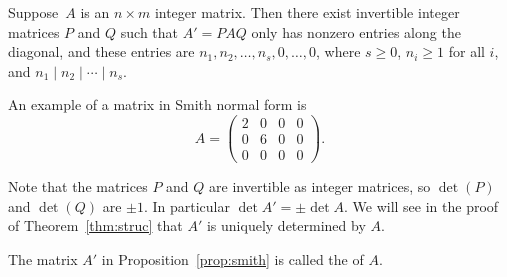 \begin{proposition}
  \label{prop:smith}
  Suppose~$A$ is an $n\times m$ integer matrix.  Then there exist
  invertible integer matrices $P$ and $Q$ such that $A'=PAQ$ only
  has nonzero entries along the diagonal, and these entries are
  $n_1, n_2,\dots, n_s,0,\dots,0$, where
  $s\geq 0$, $n_i\geq 1$ for all $i$, and $n_1\mid n_2 \mid \cdots \mid n_s$.
\end{proposition}

\begin{example}
	An example of a matrix in Smith normal form is
	\[
		A = \begin{pmatrix}
		2 & 0 & 0 & 0 \\
		0 & 6 & 0 & 0 \\
		0 & 0 & 0 & 0
		\end{pmatrix}.
	\]
\end{example}

\begin{remark}
  Note that the matrices $P$ and $Q$ are invertible as integer
  matrices, so $\det(P)$ and $\det(Q)$ are $\pm 1$. In particular
  $\det A' = \pm\det A$. We will see in the proof of Theorem~\ref{thm:struc} that
  $A'$ is uniquely determined by $A$.
\end{remark}

\begin{definition}
  The matrix $A'$ in Proposition~\ref{prop:smith}
  is called the  of $A$.
\end{definition}

